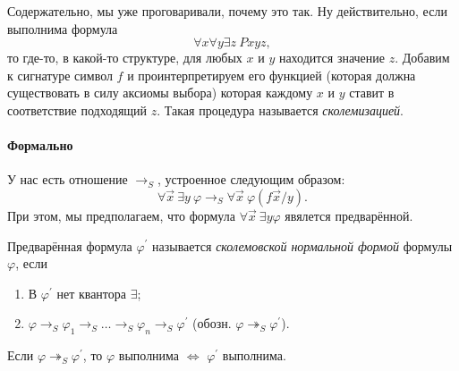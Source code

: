 Содержательно, мы уже проговаривали, почему это так.
Ну действительно, если выполнима формула
$$
    \forall x \forall y \exists z~ Pxyz,
$$
то где-то, в какой-то структуре, для любых $x$ и $y$ находится значение $z$.
Добавим к сигнатуре символ $f$ и проинтерпретируем его функцией (которая должна существовать в силу аксиомы выбора) которая каждому $x$ и $y$ ставит в соответствие подходящий $z$.
Такая процедура называется {\it сколемизацией}.

\paragraph{Формально}
У нас есть отношение $\to_{S}$, устроенное следующим образом:
$$
    \forall \vec{x}~\exists y~ \varphi \to_{S} \forall \vec{x}~\varphi(f\vec{x}/y).
$$
При этом, мы предполагаем, что формула $\forall \vec{x}~\exists y \varphi$ явялется предварённой.

\begin{definition}
    Предварённая формула $\varphi^{\prime}$ называется {\it сколемовской нормальной формой} формулы $\varphi$, если
    \begin{enumerate}
        \item В $\varphi^{\prime}$ нет квантора $\exists$;
        \item $\varphi \to_{S} \varphi_{1} \to_{S} \ldots \to_{S} \varphi_{n} \to_{S} \varphi^{\prime}$ (обозн. $\varphi \twoheadrightarrow_{S} \varphi^{\prime}$).
    \end{enumerate}
\end{definition}

\begin{statement}
    Если $\varphi \twoheadrightarrow_{S} \varphi^{\prime}$, то $\varphi$ выполнима $\iff$ $\varphi^{\prime}$ выполнима.
\end{statement}